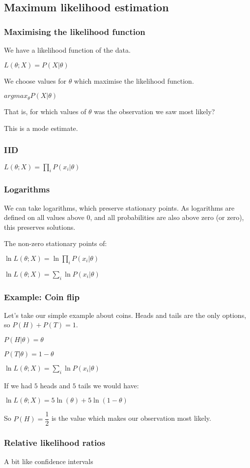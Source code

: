 
\subsection{Maximum likelihood estimation}

\subsubsection{Maximising the likelihood function}

We have a likelihood function of the data.

\(L(\theta ; X)=P(X|\theta )\)

We choose values for \(\theta \) which maximise the likelihood function.

\(argmax_\theta P(X|\theta )\)

That is, for which values  of \(\theta \) was the observation we saw most likely?

This is a mode estimate.

\subsubsection{IID}

\(L(\theta ; X)=\prod_i P(x_i|\theta )\)

\subsubsection{Logarithms}

We can take logarithms, which preserve stationary points. As logarithms are defined on all values above \(0\), and all probabilities are also above zero (or zero), this preserves solutions.

The non-zero stationary points of:

\(\ln L(\theta ; X)=\ln \prod_i P(x_i|\theta )\)

\(\ln L(\theta ; X)=\sum_i \ln P(x_i|\theta )\)

\subsubsection{Example: Coin flip}

Let’s take our simple example about coins. Heads and tails are the only options, so \(P(H)+P(T)=1\). 

\(P(H|\theta )=\theta \)

\(P(T|\theta )=1-\theta \)

\(\ln L(\theta ; X)=\sum_i \ln P(x_i|\theta )\)

If we had \(5\) heads and \(5\) tails we would have:

\(\ln L(\theta ; X)=5\ln (\theta )+ 5\ln (1-\theta )\)

So \(P(H)=\dfrac{1}{2}\) is the value which makes our observation most likely.

\subsubsection{Relative likelihood ratios}

A bit like confidence intervals
	
